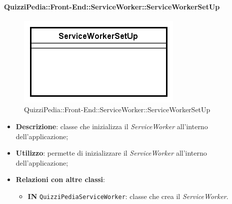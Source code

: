 \paragraph[QuizziPedia::Front-End::ServiceWorker::ServiceWorkerSetUp]{QuizziPedia::Front-End::ServiceWorker::ServiceWorkerSetUp}
\begin{figure} [ht]
	\centering
	\includegraphics[scale=0.80]{UML/Classi/Front-End/QuizziPedia_Front-End_ServiceWorker_ServiceWorkerSetUp.png}
	\caption{QuizziPedia::Front-End::ServiceWorker::ServiceWorkerSetUp}
\end{figure} \FloatBarrier
\begin{itemize}
	\item \textbf{Descrizione}: classe che inizializza il \textit{ServiceWorker} all'interno dell'applicazione;
	\item \textbf{Utilizzo}: permette di inizializzare il \textit{ServiceWorker} all'interno dell'applicazione;
	\item \textbf{Relazioni con altre classi}:
	\begin{itemize}
		\item \textbf{IN} \texttt{QuizziPediaServiceWorker}: classe che crea il \textit{ServiceWorker}.
	\end{itemize}
\end{itemize}

